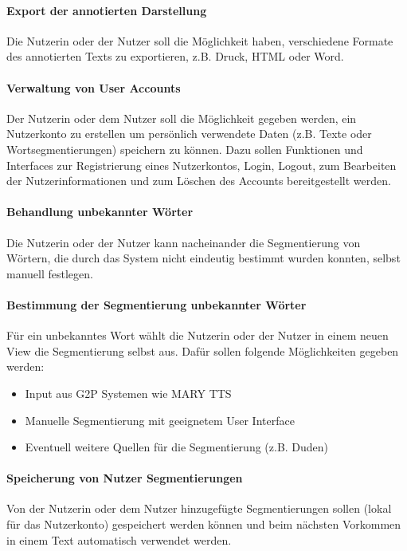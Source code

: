 \paragraph{Export der annotierten Darstellung}
Die Nutzerin oder der Nutzer soll die Möglichkeit haben, verschiedene Formate des annotierten Texts zu exportieren, z.B. Druck, HTML oder Word.

\paragraph{Verwaltung von User Accounts}
Der Nutzerin oder dem Nutzer soll die Möglichkeit gegeben werden, ein Nutzerkonto zu erstellen um persönlich verwendete Daten (z.B. Texte oder Wortsegmentierungen) speichern zu können. Dazu sollen Funktionen und Interfaces zur Registrierung eines Nutzerkontos, Login, Logout, zum Bearbeiten der Nutzerinformationen und zum Löschen des Accounts bereitgestellt werden.

\paragraph{Behandlung unbekannter Wörter}
Die Nutzerin oder der Nutzer kann nacheinander die Segmentierung von Wörtern, die durch das System nicht eindeutig bestimmt wurden konnten, selbst manuell festlegen.

\paragraph{Bestimmung der Segmentierung unbekannter Wörter}
Für ein unbekanntes Wort wählt die Nutzerin oder der Nutzer in einem neuen View die Segmentierung selbst aus. Dafür sollen folgende Möglichkeiten gegeben werden:
\begin{itemize}
	\item Input aus G2P Systemen wie MARY TTS
	\item Manuelle Segmentierung mit geeignetem User Interface
	\item Eventuell weitere Quellen für die Segmentierung (z.B. Duden)
\end{itemize}

\paragraph{Speicherung von Nutzer Segmentierungen}
Von der Nutzerin oder dem Nutzer hinzugefügte Segmentierungen sollen (lokal für das Nutzerkonto) gespeichert werden können und beim nächsten Vorkommen in einem Text automatisch verwendet werden.

